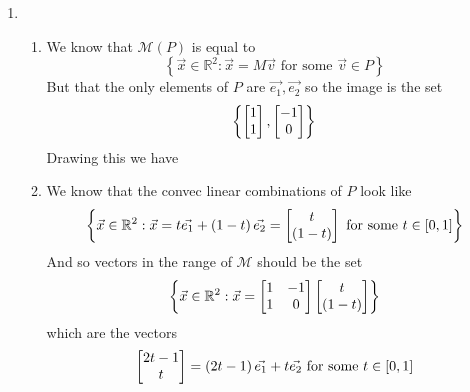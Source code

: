 \documentclass[11pt]{book}
\begin{document}
\begin{enumerate}
    \item 
    \begin{enumerate}
        \item We know that $\mathcal{M}\left(P\right)$ is equal to 
            \[
            \left\{ \vec{x} \in \mathbb{R}^2: \vec{x} = M\vec{v} \text{ for some  } \vec{v} \in P \right\}
            \]
		But that the only elements of $P$ are $\vec{e_1}, \vec{e_2}$ so the image is the set
        \begin{gather*}
            \left\{ \begin{bmatrix} 1 \\ 1 \end{bmatrix}, \begin{bmatrix} -1 \\ 0 \end{bmatrix} \right\}
        \end{gather*}
        Drawing this we have
        \begin{center}
        \end{center}
        \item We know that the convec linear combinations of $P$ look like 
            \[
                \left\{ \vec{x} \in \mathbb{R}^2: \vec{x} = t\vec{e_1} + \left( 1 - t \right)\vec{e_2} = \begin{bmatrix} t \\ \left( 1 - t \right) \end{bmatrix} \text{ for some  }t \in \left[ 0,1 \right]\right\}
            \]
            And so vectors in the range of $\mathcal{M}$ should be the set
            \[
                \left\{ \vec{x} \in \mathbb{R}^2: \vec{x} = \begin{bmatrix} 1 & -1 \\ 1 & 0 \end{bmatrix}\begin{bmatrix} t \\ \left( 1 - t \right)\end{bmatrix}  \right\}
            \]
            which are the vectors
            \[
                \begin{bmatrix} 2t - 1 \\ t \end{bmatrix} = \left( 2t - 1 \right)\vec{e_1} + t\vec{e_2} \text{ for some  } t \in \left[ 0,1 \right]
            \]
            \begin{center}
\end{center}
\end{enumerate}
\end{enumerate}
\end{document}
